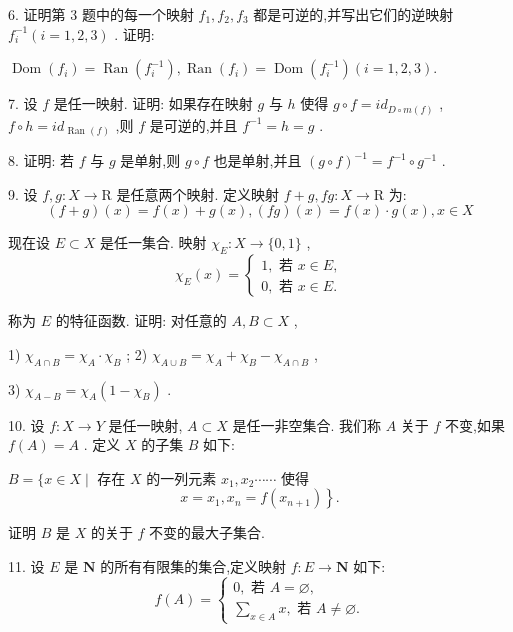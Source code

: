 6. 证明第 3 题中的每一个映射 ${f}_{1},{f}_{2},{f}_{3}$ 都是可逆的,并写出它们的逆映射 ${f}_{i}^{-1}\left( {i = 1,2,3}\right)$ . 证明:

$\operatorname{Dom}\left( {f}_{i}\right)  = \operatorname{Ran}\left( {f}_{i}^{-1}\right) ,\operatorname{Ran}\left( {f}_{i}\right)  = \operatorname{Dom}\left( {f}_{i}^{-1}\right) \left( {i = 1,2,3}\right) .$

7. 设 $f$ 是任一映射. 证明: 如果存在映射 $g$ 与 $h$ 使得 $g \circ  f = i{d}_{D \circ  m\left( f\right) }$ , $f \circ  h = i{d}_{\text{ Ran }\left( f\right) }$ ,则 $f$ 是可逆的,并且 ${f}^{-1} = h = g$ .

8. 证明: 若 $f$ 与 $g$ 是单射,则 $g \circ  f$ 也是单射,并且 ${\left( g \circ  f\right) }^{-1} = {f}^{-1} \circ  {g}^{-1}$ .

9. 设 $f,g : X \rightarrow  \mathrm{R}$ 是任意两个映射. 定义映射 $f + g,{fg} : X \rightarrow  \mathrm{R}$ 为:
$$\left( {f + g}\right) \left( x\right)  = f\left( x\right)  + g\left( x\right) ,\left( {fg}\right) \left( x\right)  = f\left( x\right)  \cdot  g\left( x\right) ,x \in  X$$

现在设 $E \subset  X$ 是任一集合. 映射 ${\chi }_{E} : X \rightarrow  \{ 0,1\}$ ,
$${\chi }_{E}\left( x\right)  = \left\{  \begin{array}{l} 1,\text{ 若 }x \in  E, \\  0,\text{ 若 }x \in  E. \end{array}\right.$$

称为 $E$ 的特征函数. 证明: 对任意的 $A,B \subset  X$ ,

1) ${\chi }_{A \cap  B} = {\chi }_{A} \cdot  {\chi }_{B}$ ; 2) ${\chi }_{A \cup  B} = {\chi }_{A} + {\chi }_{B} - {\chi }_{A \cap  B}$ ,

3) ${\chi }_{A - B} = {\chi }_{A}\left( {1 - {\chi }_{B}}\right)$ .

10. 设 $f : X \rightarrow  Y$ 是任一映射, $A \subset  X$ 是任一非空集合. 我们称 $A$ 关于 $f$ 不变,如果 $f\left( A\right)  = A$ . 定义 $X$ 的子集 $B$ 如下:

$B = \{ x \in  X \mid$ 存在 $X$ 的一列元素 ${x}_{1},{x}_{2}\cdots \cdots$ 使得
$$\left. {x = {x}_{1},{x}_{n} = f\left( {x}_{n + 1}\right) }\right\}  .$$

证明 $B$ 是 $X$ 的关于 $f$ 不变的最大子集合.

11. 设 $E$ 是 $\mathbf{N}$ 的所有有限集的集合,定义映射 $f : E \rightarrow  \mathbf{N}$ 如下:
$$f\left( A\right)  = \left\{  \begin{array}{l} 0,\text{ 若 }A = \varnothing , \\  \mathop{\sum }\limits_{{x \in  A}}x,\text{ 若 }A \neq  \varnothing . \end{array}\right.$$

